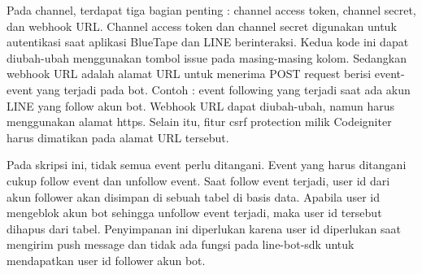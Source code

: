 	Pada channel, terdapat tiga bagian penting : channel access token, channel secret, dan webhook URL. Channel access token dan channel secret digunakan untuk autentikasi saat aplikasi BlueTape dan LINE berinteraksi. Kedua kode ini dapat diubah-ubah menggunakan tombol issue pada masing-masing kolom. Sedangkan webhook URL adalah alamat URL untuk menerima POST request berisi event-event yang terjadi pada bot. Contoh : event following yang terjadi saat ada akun LINE yang follow akun bot. Webhook URL dapat diubah-ubah, namun harus menggunakan alamat https. Selain itu, fitur csrf protection milik Codeigniter harus dimatikan pada alamat URL tersebut.
	
	Pada skripsi ini, tidak semua event perlu ditangani. Event yang harus ditangani cukup follow event dan unfollow event. Saat follow event terjadi, user id dari akun follower akan disimpan di sebuah tabel di basis data. Apabila user id mengeblok akun bot sehingga unfollow event terjadi, maka user id tersebut dihapus dari tabel. Penyimpanan ini diperlukan karena user id diperlukan saat mengirim push message dan tidak ada fungsi pada line-bot-sdk untuk mendapatkan user id follower akun bot.